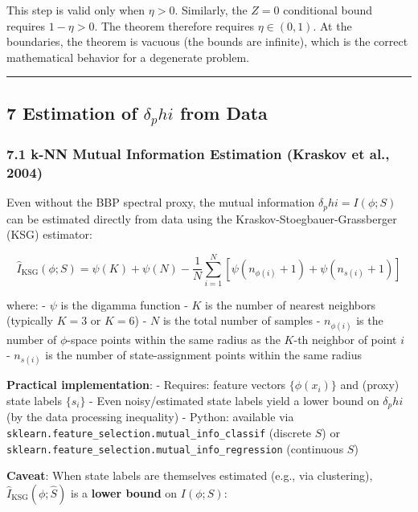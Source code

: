 \documentclass[
  12pt,
]{ctexart}
\begin{document}
This step is valid only when \(\eta > 0\). Similarly, the \(Z=0\)
conditional bound requires \(1-\eta > 0\). The theorem therefore
requires \(\eta \in (0,1)\). At the boundaries, the theorem is vacuous
(the bounds are infinite), which is the correct mathematical behavior
for a degenerate problem.

\begin{center}\rule{0.5\linewidth}{0.5pt}\end{center}

\subsection{\texorpdfstring{7 Estimation of \(\delta_phi\) from
Data}{7 Estimation of \textbackslash delta\_phi from Data}}\label{estimation-of-delta_phi-from-data}

\subsubsection{7.1 k-NN Mutual Information Estimation (Kraskov et al.,
2004)}\label{k-nn-mutual-information-estimation-kraskov-et-al.-2004}

Even without the BBP spectral proxy, the mutual information
\(\delta_phi = I(\phi; S)\) can be estimated directly from data using
the Kraskov-Stoegbauer-Grassberger (KSG) estimator:

\[\hat{I}_{\text{KSG}}(\phi; S) = \psi(K) + \psi(N) - \frac{1}{N} \sum_{i=1}^N \left[\psi(n_{\phi(i)}+1) + \psi(n_{s(i)}+1)\right]\]

where: - \(\psi\) is the digamma function - \(K\) is the number of
nearest neighbors (typically \(K=3\) or \(K=6\)) - \(N\) is the total
number of samples - \(n_{\phi(i)}\) is the number of \(\phi\)-space
points within the same radius as the \(K\)-th neighbor of point \(i\) -
\(n_{s(i)}\) is the number of state-assignment points within the same
radius

\textbf{Practical implementation}: - Requires: feature vectors
\(\{\phi(x_i)\}\) and (proxy) state labels \(\{s_i\}\) - Even
noisy/estimated state labels yield a lower bound on \(\delta_phi\) (by
the data processing inequality) - Python: available via
\texttt{sklearn.feature\_selection.mutual\_info\_classif} (discrete
\(S\)) or \texttt{sklearn.feature\_selection.mutual\_info\_regression}
(continuous \(S\))

\textbf{Caveat}: When state labels are themselves estimated (e.g., via
clustering), \(\hat{I}_{\text{KSG}}(\phi; \hat{S})\) is a \textbf{lower
bound} on \(I(\phi; S)\):
\end{document}
